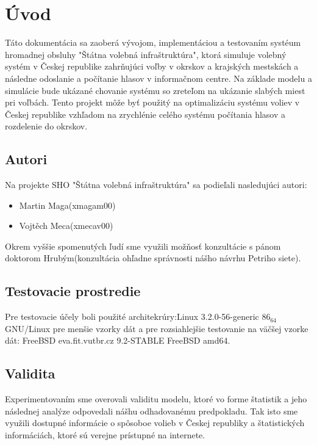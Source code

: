 \documentclass[12pt,a4paper,titlepage,final]{article}
\begin{document}


\tableofcontents
\newpage

\section{Úvod}
Táto dokumentácia sa zaoberá vývojom, implementáciou a testovaním systéum hromadnej obsluhy "Štátna volebná infraštruktúra", ktorá simuluje volebný systém v Českej republike zahrňujúci voľby v okrskov a krajských mestskách a následne odoslanie a počítanie hlasov v informačnom centre.
\indent
Na základe modelu a simulácie bude ukázané chovanie systému so zreteľom na ukázanie slabých miest pri voľbách. Tento projekt môže byť použitý na optimalizáciu systému voliev v Českej republike vzhľadom na zrychlénie celého systému počítania hlasov a rozdelenie do okrskov.

\subsection{Autori}
Na projekte SHO "Štátna volebná infraštruktúra" sa podieľali nasledujúci autori:
\begin{itemize}
\item Martin Maga(xmagam00)
\item Vojtěch Meca(xmecav00)
\end{itemize}

Okrem vyššie spomenutých ľudí sme využili možňosť konzultácie s pánom doktorom Hrubým(konzultácia ohľadne správnosti nášho návrhu Petriho siete).

\subsection{Testovacie prostredie}
Pre testovacie účely boli použité architekrúry:Linux 3.2.0-56-generic $86_64$ GNU/Linux pre menšie vzorky dát a pre rozsiahlejšie testovanie na väčšej vzorke dát: FreeBSD eva.fit.vutbr.cz 9.2-STABLE FreeBSD amd64.

\subsection{Validita}
Experimentovaním sme overovali validitu modelu, ktoré vo forme štatistik a jeho následnej analýze odpovedali nášhu odhadovanému predpokladu. Tak isto sme využili dostupné informácie o spôsoboe volieb v Českej republiky a štatistických informáciách, ktoré sú verejne prístupné na internete.
\end{document}
